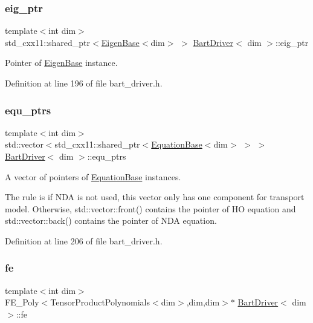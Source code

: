 \subsubsection{\texorpdfstring{eig\+\_\+ptr}{eig\_ptr}}
{\footnotesize\ttfamily template$<$int dim$>$ \\
std\+\_\+cxx11\+::shared\+\_\+ptr$<$\hyperlink{class_eigen_base}{Eigen\+Base}$<$dim$>$ $>$ \hyperlink{class_bart_driver}{Bart\+Driver}$<$ dim $>$\+::eig\+\_\+ptr\hspace{0.3cm}{\ttfamily [private]}}



Pointer of \hyperlink{class_eigen_base}{Eigen\+Base} instance. 



Definition at line 196 of file bart\+\_\+driver.\+h.

\mbox{\label{class_bart_driver_a0a6f52aed8e9c22da12a99653d1acba8}} 
\subsubsection{\texorpdfstring{equ\+\_\+ptrs}{equ\_ptrs}}
{\footnotesize\ttfamily template$<$int dim$>$ \\
std\+::vector$<$std\+\_\+cxx11\+::shared\+\_\+ptr$<$\hyperlink{class_equation_base}{Equation\+Base}$<$dim$>$ $>$ $>$ \hyperlink{class_bart_driver}{Bart\+Driver}$<$ dim $>$\+::equ\+\_\+ptrs\hspace{0.3cm}{\ttfamily [private]}}



A vector of pointers of \hyperlink{class_equation_base}{Equation\+Base} instances. 

The rule is if N\+DA is not used, this vector only has one component for transport model. Otherwise, std\+::vector\+::front() contains the pointer of HO equation and std\+::vector\+::back() contains the pointer of N\+DA equation. 

Definition at line 206 of file bart\+\_\+driver.\+h.

\mbox{\label{class_bart_driver_ac2e63d4ab8a403649e19f4b1acf94c04}} 
\subsubsection{\texorpdfstring{fe}{fe}}
{\footnotesize\ttfamily template$<$int dim$>$ \\
F\+E\+\_\+\+Poly$<$Tensor\+Product\+Polynomials$<$dim$>$,dim,dim$>$$\ast$ \hyperlink{class_bart_driver}{Bart\+Driver}$<$ dim $>$\+::fe\hspace{0.3cm}{\ttfamily [private]}}



